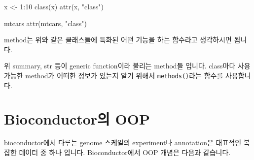 \documentclass[
]{book}
\newenvironment{Shaded}{\begin{snugshade}}{\end{snugshade}}
\newcommand{\AttributeTok}[1]{\textcolor[rgb]{0.77,0.63,0.00}{#1}}
\newcommand{\DecValTok}[1]{\textcolor[rgb]{0.00,0.00,0.81}{#1}}
\newcommand{\FunctionTok}[1]{\textcolor[rgb]{0.00,0.00,0.00}{#1}}
\newcommand{\NormalTok}[1]{#1}
\newcommand{\OtherTok}[1]{\textcolor[rgb]{0.56,0.35,0.01}{#1}}
\newcommand{\SpecialCharTok}[1]{\textcolor[rgb]{0.00,0.00,0.00}{#1}}
\newcommand{\StringTok}[1]{\textcolor[rgb]{0.31,0.60,0.02}{#1}}
\begin{document}
\begin{Shaded}
\begin{Highlighting}[]
\NormalTok{x }\OtherTok{\textless{}{-}} \DecValTok{1}\SpecialCharTok{:}\DecValTok{10}
\FunctionTok{class}\NormalTok{(x)}
\FunctionTok{attr}\NormalTok{(x, }\StringTok{"class"}\NormalTok{)}

\NormalTok{mtcars}
\FunctionTok{attr}\NormalTok{(mtcars, }\StringTok{"class"}\NormalTok{)}
\end{Highlighting}
\end{Shaded}

method는 위와 같은 클래스들에 특화된 어떤 기능을 하는 함수라고 생각하시면 됩니다.

\begin{Shaded}
\end{Shaded}

위 summary, str 등이 generic function이라 불리는 method들 입니다. class마다 사용 가능한 method가 어떠한 정보가 있는지 알기 위해서 \texttt{methods()}라는 함수를 사용합니다.

\hypertarget{bioconductoruxc758-oop}{%
\section{Bioconductor의 OOP}\label{bioconductoruxc758-oop}}

bioconductor에서 다루는 genome 스케일의 experiment나 annotation은 대표적인 복잡한 데이터 중 하나 입니다. Bioconductor에서 OOP 개념은 다음과 같습니다.
\end{document}
